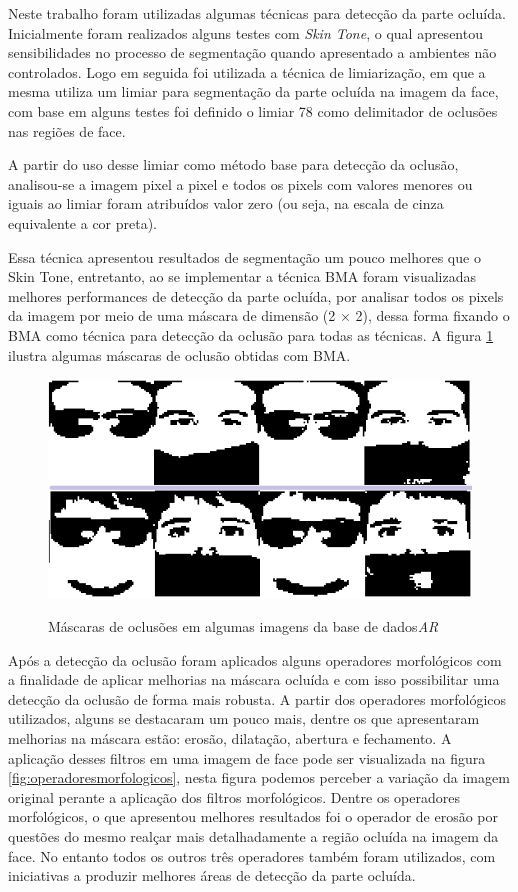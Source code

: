 Neste trabalho foram utilizadas algumas técnicas para detecção da parte ocluída. Inicialmente foram realizados alguns testes com \textit{Skin Tone}, o qual apresentou sensibilidades no processo de segmentação quando apresentado a ambientes não controlados. Logo em seguida foi utilizada a técnica de limiarização, em que a mesma utiliza um limiar para segmentação da parte ocluída na imagem da face, com base em alguns testes foi definido o limiar 78 como delimitador de oclusões nas regiões de face. 

A partir do uso desse limiar como método base para detecção da oclusão, analisou-se a imagem pixel a pixel e todos os pixels com valores menores ou iguais ao limiar foram atribuídos valor zero (ou seja, na escala de cinza equivalente a cor preta). 


Essa técnica apresentou resultados de segmentação um pouco melhores que o Skin Tone, entretanto, ao se implementar a técnica  BMA foram visualizadas melhores performances de detecção da parte ocluída, por analisar todos os pixels da imagem por meio de uma máscara de dimensão (2 $\times$ 2), dessa forma fixando o BMA como técnica para detecção da oclusão para todas as técnicas. A figura \ref{fig:mascaraOclusao} ilustra algumas máscaras de oclusão obtidas com BMA.

\begin{figure}[H]
\caption{Máscaras de oclusões em algumas imagens da base de dados\textit{AR}}
\center
\includegraphics{imgs/mascaraOclusao.png}
\label{fig:mascaraOclusao}
\end{figure}
 
Após a detecção da oclusão foram aplicados alguns operadores morfológicos com a finalidade de aplicar melhorias na máscara ocluída e com isso possibilitar uma detecção da oclusão de forma mais robusta. A partir dos operadores morfológicos utilizados, alguns se destacaram um pouco mais, dentre os que apresentaram melhorias na máscara estão: erosão, dilatação, abertura e fechamento. A aplicação desses filtros em uma imagem de face pode ser visualizada na figura \ref{fig:operadoresmorfologicos}, nesta figura podemos perceber a variação da imagem original perante a aplicação dos filtros morfológicos. Dentre os operadores morfológicos, o que apresentou melhores resultados foi o operador de erosão por questões do mesmo realçar mais detalhadamente a região ocluída na imagem da face. No entanto todos os outros três operadores também foram utilizados, com iniciativas a produzir melhores áreas de detecção da parte ocluída.


